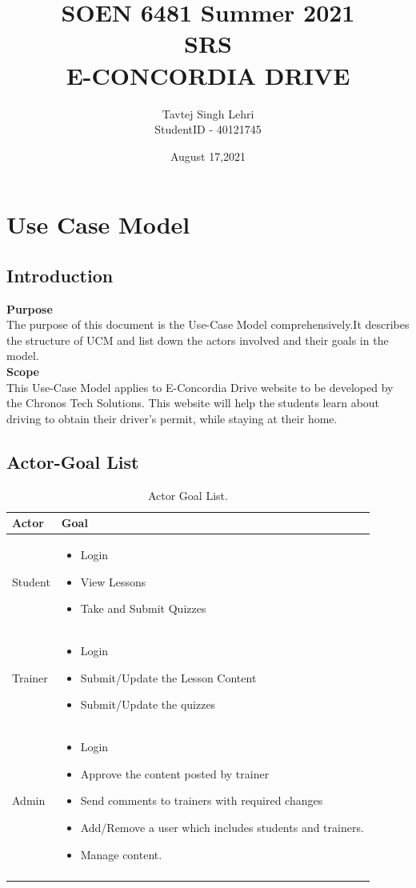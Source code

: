 \documentclass{report}
\title{\normalsize {SOEN 6481 Summer 2021}\\[1.0cm]
\huge \textbf{\uppercase{SRS}} \\
\huge \textbf{\uppercase{e-concordia drive}}\\
\normalsize \vspace*{2\baselineskip}
}
\author{{Tavtej Singh Lehri\\
StudentID - 40121745}}
\date{August 17,2021}
\begin{document}
\maketitle

\tableofcontents
\clearpage

\chapter{Use Case Model}
\section{Introduction}
\textbf{\large Purpose}\\
The purpose of this document is the Use-Case Model comprehensively.It describes the structure of UCM and list down the actors involved and their goals in the model.\\[1cm]
\textbf{\large Scope}\\
This Use-Case Model applies to E-Concordia Drive website to be developed by the Chronos Tech Solutions. This website will help the students learn about driving to obtain their driver's permit, while staying at their home.

\section{Actor-Goal List}
\begin{longtable}{|p{3.5cm}|p{9.5cm}|}\hline
     \textbf{Actor}&\textbf{Goal}  \\ \hline
     Student&\begin{itemize}
         \item Login
         \item View Lessons
         \item Take and Submit Quizzes
     \end{itemize} \\ \hline
     Trainer&\begin{itemize}
         \item Login
         \item Submit/Update the Lesson Content
         \item Submit/Update the quizzes
     \end{itemize} \\ \hline
     Admin&\begin{itemize}
         \item Login
         \item Approve the content posted by trainer
         \item Send comments to trainers with required changes
         \item Add/Remove a user which includes students and trainers.
         \item Manage content.
     \end{itemize} \\ \hline
     \caption{Actor Goal List.\label{long}}\\
\end{longtable}
\end{document}
